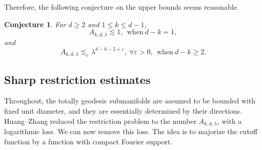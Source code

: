 \documentclass[11pt,reqno]{amsart}
\newtheorem{conjecture}[theorem]{Conjecture}
\numberwithin{equation}{section}
\newcommand{\1}{\textbf{1}}
\newcommand{\ls}{\lesssim}
\newcommand{\eps}{\varepsilon}
\newcommand{\la}{\lambda}
\begin{document}
	Therefore, the following conjecture on the upper bounds seems reasonable.
	\begin{conjecture}\label{Aconj}
		For $d\ge2$ and $1\le k\le d-1$,
		\begin{equation}
			A_{k,d,\la}\ls1,\ \ \text{when}\ d-k=1,
		\end{equation}
		and
		\begin{equation}
			A_{k,d,\la}\ls_{\eps}\la^{d-k-2+\eps},\ \forall \eps>0,\ \ \text{when}\ d-k\ge2.
		\end{equation}
	\end{conjecture}
	
	\subsection{Sharp restriction estimates}
	Throughout, the totally geodesic submanifolds are assumed to be bounded with fixed unit diameter, and they are essentially determined by their directions. Huang--Zhang \cite[Theorem 3]{hzapde} reduced the restriction problem to the number $A_{k,d,\la}$, with a logarithmic loss. We can now remove this loss. The idea is to majorize the cutoff function by a function with compact Fourier support.
	
\end{document}
